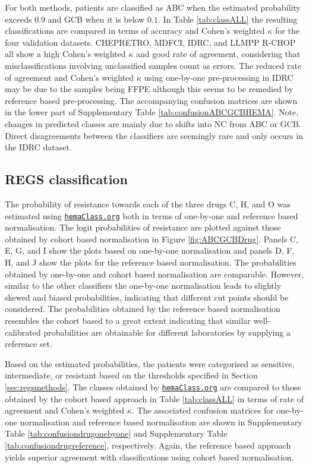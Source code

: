 \documentclass[twocolumn]{bmcart}%
\newcommand{\hemaClass}{\href{http://hemaClass.org}{\texttt{hemaClass.org}}}
\begin{document}
For both methods, patients are classified as ABC when the estimated probability exceeds $0.9$ and GCB when it is below $0.1$.
In Table \ref{tab:classALL} the resulting classifications are compared in terms of accuracy and Cohen's weighted $\kappa$ for the four validation datasets.
CHEPRETRO, MDFCI, IDRC, and LLMPP R-CHOP all show a high Cohen's weighted $\kappa$ and good rate of agreement, considering that misclassifications involving unclassified samples count as errors.
The reduced rate of agreement and Cohen's weighted $\kappa$ using one-by-one pre-processing in IDRC may be due to the samples being FFPE although this seems to be remedied by reference based pre-processing.
The accompanying confusion matrices are shown in the lower part of Supplementary Table \ref{tab:confusionABCGCBHEMA}.
Note, changes in predicted classes are mainly due to shifts into NC from ABC or GCB.
Direct disagreements between the classifiers are seemingly rare and only occurs in the IDRC dataset.




\subsection{REGS classification}
The probability of resistance towards each of the three drugs C, H, and O was estimated using \hemaClass{} both in terms of one-by-one and reference based normalisation.
The logit probabilities of resistance are plotted against those obtained by cohort based normalisation in Figure \ref{fig:ABCGCBDrug}.
Panels C, E, G, and I show the plots based on one-by-one normalisation and panels D, F, H, and J show the plots for the reference based normalisation.
The probabilities obtained by one-by-one and cohort based normalisation are comparable. However, similar to the other classifiers the one-by-one normalisation leads to slightly skewed and biased probabilities, indicating that different cut points should be considered.
The probabilities obtained by the reference based normalisation resembles the cohort based to a great extent indicating that similar well-calibrated probabilities are obtainable for different laboratories by supplying a reference set.

Based on the estimated probabilities, the patients were categorised as sensitive, intermediate, or resistant based on the thresholds specified in Section \ref{sec:regsmethods}.
The classes obtained by \hemaClass{} are compared to those obtained by the cohort based approach in Table \ref{tab:classALL} in terms of rate of agreement and Cohen's weighted $\kappa$.
The associated confusion matrices for one-by-one normalisation and reference based normalisation are shown in Supplementary Table \ref{tab:confusiondrugonebyone} and Supplementary Table \ref{tab:confusiondrugreference}, respectively.
Again, the reference based approach yields superior agreement with classifications using cohort based normalisation.
\end{document}
